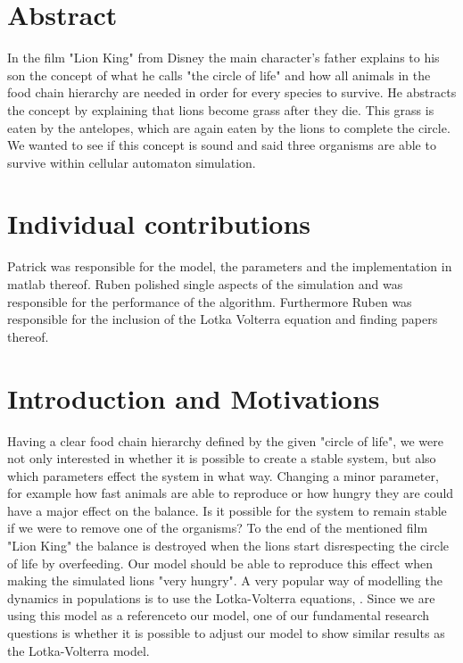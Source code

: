 \documentclass[11pt]{article}
\begin{document}
\section{Abstract}
In the film "Lion King" from Disney the main character's father explains to his son the concept of what he calls "the circle of life" and how all animals in the food chain hierarchy are needed in order for every species to survive. He abstracts the concept by explaining that lions become grass after they die. This grass is eaten by the antelopes, which are again eaten by the lions to complete the circle. We wanted to see if this concept is sound and said three organisms are able to survive within cellular automaton simulation.

\section{Individual contributions}
Patrick was responsible for the model, the parameters and the implementation in matlab thereof. Ruben polished single aspects of the simulation and was responsible for the performance of the algorithm. Furthermore Ruben was responsible for the inclusion of the Lotka Volterra equation and finding papers thereof.

\section{Introduction and Motivations}
Having a clear food chain hierarchy defined by the given "circle of life", we were not only interested in whether it is possible to create a stable system, but also which parameters effect the system in what way. Changing a minor parameter, for example how fast animals are able to reproduce or how hungry they are could have a major effect on the balance. Is it possible for the system to remain stable if we were to remove one of the organisms? To the end of the mentioned film "Lion King" the balance is destroyed when the lions start disrespecting the circle of life by overfeeding. Our model should be able to reproduce this effect when making the simulated lions "very hungry".
A very popular way of modelling the dynamics in populations is to use the Lotka-Volterra equations, \cite{lotkaVolterra}. Since we are using this model as a referenceto our model, one of our fundamental research questions is whether it is possible to adjust our model to show similar results as the Lotka-Volterra model.
\end{document}
